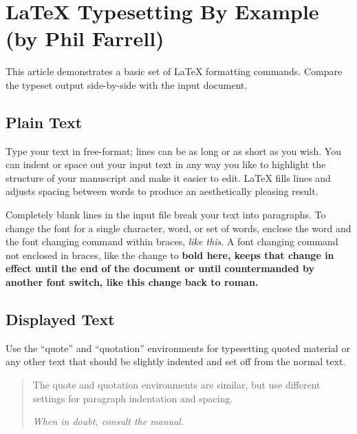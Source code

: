 %
\section{LaTeX Typesetting By Example (by Phil Farrell)}
This article demonstrates a basic set of LaTeX formatting commands.
Compare the typeset output side-by-side with the input document.

\subsection{Plain Text}
Type your text in free-format; lines can be as long
or as short
as you wish.
        You can indent         or space out
        your input 
            text in 
                any way you like to highlight the structure
        of your manuscript and make it easier to edit.
LaTeX fills lines and adjusts spacing between words to produce an
aesthetically pleasing result.

Completely blank lines in the input file break your text into
paragraphs.
To change the font for a single character, word, or set of words, 
enclose the word and the font changing command within braces, 
{\em like this}.
A font changing command not enclosed in braces, like the change to \bf 
bold here, keeps that change in effect until the end of the document or
until countermanded by another font switch, like this change back to 
\rm roman. 

\subsection{Displayed Text}
Use the ``quote'' and  ``quotation'' environments for typesetting quoted
material or any other text that should be slightly indented and set off
from the normal text.
\begin{quotation}
The quote and quotation environments are similar, but use different 
settings for paragraph indentation and spacing.

\em When in doubt, consult the manual.
\end{quotation}

